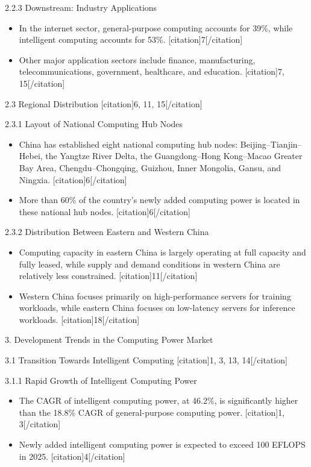 \documentclass{huawei}
\begin{document}
\begin{tcolorbox}[
    title={Example of Hierarchical Research Outline},
    colback=gray!5,
    colframe=gray!40,
    fonttitle=\bfseries,
    boxrule=0.5pt,
    arc=2pt,
    breakable
]
\textcolor{TitleRed}{2.2.3 Downstream: Industry Applications}
\begin{itemize}[leftmargin=1em, listparindent=\parindent]
\item In the internet sector, general-purpose computing accounts for 39\%, while intelligent computing accounts for 53\%. [citation]7[/citation]
\item Other major application sectors include finance, manufacturing, telecommunications, government, healthcare, and education. [citation]7, 15[/citation]
\end{itemize}

\textcolor{TitleRed}{2.3 Regional Distribution [citation]6, 11, 15[/citation]}

\textcolor{TitleRed}{2.3.1 Layout of National Computing Hub Nodes}
\begin{itemize}[leftmargin=1em, listparindent=\parindent]
\item China has established eight national computing hub nodes: Beijing–Tianjin–Hebei, the Yangtze River Delta, the Guangdong–Hong Kong–Macao Greater Bay Area, Chengdu–Chongqing, Guizhou, Inner Mongolia, Gansu, and Ningxia. [citation]6[/citation]
\item More than 60\% of the country’s newly added computing power is located in these national hub nodes. [citation]6[/citation]
\end{itemize}

\textcolor{TitleRed}{2.3.2 Distribution Between Eastern and Western China}
\begin{itemize}[leftmargin=1em, listparindent=\parindent]
\item Computing capacity in eastern China is largely operating at full capacity and fully leased, while supply and demand conditions in western China are relatively less constrained. [citation]11[/citation]
\item Western China focuses primarily on high-performance servers for training workloads, while eastern China focuses on low-latency servers for inference workloads. [citation]18[/citation]
\end{itemize}

\textcolor{TitleRed}{3. Development Trends in the Computing Power Market}

\textcolor{TitleRed}{3.1 Transition Towards Intelligent Computing [citation]1, 3, 13, 14[/citation]}

\textcolor{TitleRed}{3.1.1 Rapid Growth of Intelligent Computing Power}
\begin{itemize}[leftmargin=1em, listparindent=\parindent]
\item The CAGR of intelligent computing power, at 46.2\%, is significantly higher than the 18.8\% CAGR of general-purpose computing power. [citation]1, 3[/citation]
\item Newly added intelligent computing power is expected to exceed 100 EFLOPS in 2025. [citation]4[/citation]
\end{itemize}


\end{tcolorbox}
\end{document}
